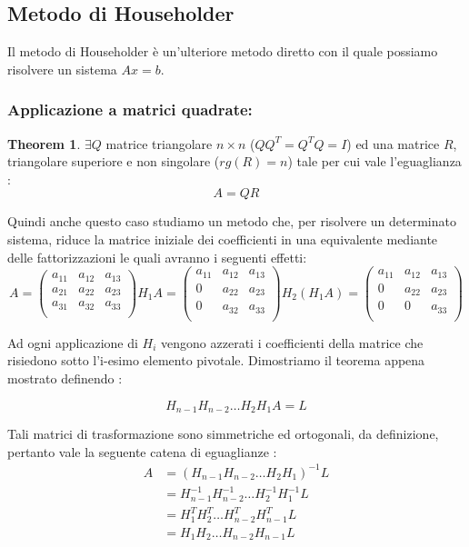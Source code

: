 \documentclass[12pt, a4paper]{book}
\theoremstyle{definition}
\newtheorem{theorem}{Theorem}
\begin{document}
\subsection{Metodo di Householder}
\begin{flushleft}

Il metodo di Householder è un'ulteriore metodo diretto con il 	quale possiamo risolvere un sistema $Ax = b$.

\subsubsection{Applicazione a matrici quadrate: }
\begin{theorem}
	$\exists Q$ matrice triangolare $n \times n$ ($QQ^{T} = Q^{T}Q = I$) ed una matrice $R$, triangolare superiore e non singolare ($rg(R) = n$) tale per cui vale l'eguaglianza : 
	\[ 
		A = QR	
	\]
\end{theorem}

Quindi anche questo caso studiamo un metodo che, per risolvere un determinato sistema,  riduce la matrice iniziale dei coefficienti in una equivalente mediante delle fattorizzazioni le quali avranno i seguenti effetti:
\[	
	A = 
	\begin{pmatrix}
		 a_{11} & a_{12} & a_{13} \\
		 a_{21} & a_{22} & a_{23} \\
		a_{31} & a_{32} & a_{33} \\
	\end{pmatrix}
	H_{1}A = 
	\begin{pmatrix}
		 a_{11} & a_{12} & a_{13} \\
		0 & a_{22} & a_{23} \\
		0 & a_{32} & a_{33} \\
	\end{pmatrix}
	H_{2}(H_{1}A) = 
	\begin{pmatrix}
		 a_{11} & a_{12} & a_{13} \\
		0 & a_{22} & a_{23} \\
		0 & 0 & a_{33} \\
	\end{pmatrix}
\]

Ad ogni applicazione di $H_{i}$ vengono azzerati i coefficienti della matrice che risiedono sotto l'i-esimo elemento pivotale.
Dimostriamo il teorema appena mostrato definendo :

\[	
	H_{n-1}H_{n-2} \dots H_{2}H_{1}A = L 
\]

Tali matrici di trasformazione sono simmetriche ed ortogonali, da definizione, pertanto vale la seguente catena di eguaglianze :
\[ 	
	\begin{split}
		A &= (H_{n-1}H_{n-2} \dots H_{2}H_{1})^{-1} L \\
		   &= H_{n-1}^{-1} H_{n-2}^{-1} \dots H_{2}^{-1}H_{1}^{-1} L \\
		   &= H_{1}^{T}H_{2}^{T} \dots  H_{n-2}^{T}H_{n-1}^{T} L \\
		   &= H_{1}H_{2} \dots H_{n-2}H_{n-1} L
	\end{split}
\]


\end{flushleft}
\end{document}

